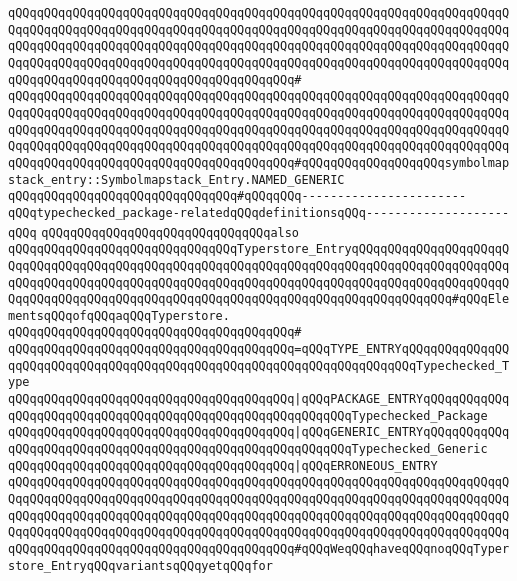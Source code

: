\verb|qQQqqQQqqQQqqQQqqQQqqQQqqQQqqQQqqQQqqQQqqQQqqQQqqQQqqQQqqQQqqQQqqQQqqQQqqQQqqQQqqQQqqQQqqQQqqQQqqQQqqQQqqQQqqQQqqQQqqQQqqQQqqQQqqQQqqQQqqQQqqQQqqQQqqQQqqQQqqQQqqQQqqQQqqQQqqQQqqQQqqQQqqQQqqQQqqQQqqQQqqQQqqQQqqQQqqQQqqQQqqQQqqQQqqQQqqQQqqQQqqQQqqQQqqQQqqQQqqQQqqQQqqQQqqQQqqQQqqQQqqQQqqQQqqQQqqQQqqQQqqQQqqQQqqQQqqQQqqQQq#|\newline
\verb|qQQqqQQqqQQqqQQqqQQqqQQqqQQqqQQqqQQqqQQqqQQqqQQqqQQqqQQqqQQqqQQqqQQqqQQqqQQqqQQqqQQqqQQqqQQqqQQqqQQqqQQqqQQqqQQqqQQqqQQqqQQqqQQqqQQqqQQqqQQqqQQqqQQqqQQqqQQqqQQqqQQqqQQqqQQqqQQqqQQqqQQqqQQqqQQqqQQqqQQqqQQqqQQqqQQqqQQqqQQqqQQqqQQqqQQqqQQqqQQqqQQqqQQqqQQqqQQqqQQqqQQqqQQqqQQqqQQqqQQqqQQqqQQqqQQqqQQqqQQqqQQqqQQqqQQqqQQqqQQq#qQQqqQQqqQQqqQQqqQQqsymbolmapstack_entry::Symbolmapstack_Entry.NAMED_GENERIC|\newline
\newline
\verb|qQQqqQQqqQQqqQQqqQQqqQQqqQQqqQQq#qQQqqQQq-----------------------qQQqtypechecked_package-relatedqQQqdefinitionsqQQq--------------------qQQq|\newline
\newline
\verb|qQQqqQQqqQQqqQQqqQQqqQQqqQQqqQQqalso|\newline
\verb|qQQqqQQqqQQqqQQqqQQqqQQqqQQqqQQqTyperstore_EntryqQQqqQQqqQQqqQQqqQQqqQQqqQQqqQQqqQQqqQQqqQQqqQQqqQQqqQQqqQQqqQQqqQQqqQQqqQQqqQQqqQQqqQQqqQQqqQQqqQQqqQQqqQQqqQQqqQQqqQQqqQQqqQQqqQQqqQQqqQQqqQQqqQQqqQQqqQQqqQQqqQQqqQQqqQQqqQQqqQQqqQQqqQQqqQQqqQQqqQQqqQQqqQQqqQQqqQQqqQQqqQQq#qQQqElementsqQQqofqQQqaqQQqTyperstore.|\newline
\verb|qQQqqQQqqQQqqQQqqQQqqQQqqQQqqQQqqQQqqQQq#|\newline
\verb|qQQqqQQqqQQqqQQqqQQqqQQqqQQqqQQqqQQqqQQq=qQQqTYPE_ENTRYqQQqqQQqqQQqqQQqqQQqqQQqqQQqqQQqqQQqqQQqqQQqqQQqqQQqqQQqqQQqqQQqqQQqqQQqTypechecked_Type|\newline
\verb|qQQqqQQqqQQqqQQqqQQqqQQqqQQqqQQqqQQqqQQq|\verb#|qQQqPACKAGE_ENTRYqQQqqQQqqQQqqQQqqQQqqQQqqQQqqQQqqQQqqQQqqQQqqQQqqQQqqQQqqQQqTypechecked_Package#\newline
\verb|qQQqqQQqqQQqqQQqqQQqqQQqqQQqqQQqqQQqqQQq|\verb#|qQQqGENERIC_ENTRYqQQqqQQqqQQqqQQqqQQqqQQqqQQqqQQqqQQqqQQqqQQqqQQqqQQqqQQqqQQqTypechecked_Generic#\newline
\verb|qQQqqQQqqQQqqQQqqQQqqQQqqQQqqQQqqQQqqQQq|\verb#|qQQqERRONEOUS_ENTRY#\newline
\verb|qQQqqQQqqQQqqQQqqQQqqQQqqQQqqQQqqQQqqQQqqQQqqQQqqQQqqQQqqQQqqQQqqQQqqQQqqQQqqQQqqQQqqQQqqQQqqQQqqQQqqQQqqQQqqQQqqQQqqQQqqQQqqQQqqQQqqQQqqQQqqQQqqQQqqQQqqQQqqQQqqQQqqQQqqQQqqQQqqQQqqQQqqQQqqQQqqQQqqQQqqQQqqQQqqQQqqQQqqQQqqQQqqQQqqQQqqQQqqQQqqQQqqQQqqQQqqQQqqQQqqQQqqQQqqQQqqQQqqQQqqQQqqQQqqQQqqQQqqQQqqQQqqQQqqQQqqQQqqQQq#qQQqWeqQQqhaveqQQqnoqQQqTyperstore_EntryqQQqvariantsqQQqyetqQQqfor|\newline
